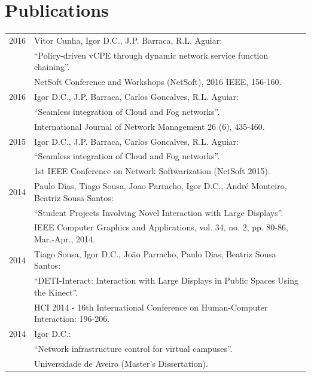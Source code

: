 \documentclass[letter,10pt]{article} %
\begin{document}
\section{Publications}
\label{section:publications}
\begin{tabular}{rl}
\textsc{2016} & Vitor Cunha, Igor D.C., J.P. Barraca, R.L. Aguiar: \\
& ``Policy-driven vCPE through dynamic network service function chaining''. \\
& NetSoft Conference and Workshops (NetSoft), 2016 IEEE, 156-160. \normalsize\\

\textsc{2016} & Igor D.C., J.P. Barraca, Carlos Goncalves, R.L. Aguiar: \\
& ``Seamless integration of Cloud and Fog networks''. \\
& International Journal of Network Management 26 (6), 435-460. \normalsize\\

\textsc{2015} & Igor D.C., J.P. Barraca, Carlos Goncalves, R.L. Aguiar: \\
& ``Seamless integration of Cloud and Fog networks''. \\
& 1st IEEE Conference on Network Softwarization (NetSoft 2015). \normalsize\\

\textsc{2014} & Paulo Dias, Tiago Sousa, Joao Parracho, Igor D.C., André Monteiro, Beatriz Sousa Santos: \\
& ``Student Projects Involving Novel Interaction with Large Displays''. \\
& IEEE Computer Graphics and Applications, vol. 34, no. 2, pp. 80-86, Mar.-Apr., 2014. \normalsize\\

\textsc{2014} & Tiago Sousa, Igor D.C., João Parracho, Paulo Dias, Beatriz Sousa Santos: \\
& ``DETI-Interact: Interaction with Large Displays in Public Spaces Using the Kinect''. \\
& HCI 2014 - 16th International Conference on Human-Computer Interaction: 196-206. \normalsize\\

\textsc{2014} & Igor D.C.: \\
& ``Network infrastructure control for virtual campuses''. \\
& Universidade de Aveiro (Master's Dissertation). \normalsize\\


\end{tabular}
\end{document}
